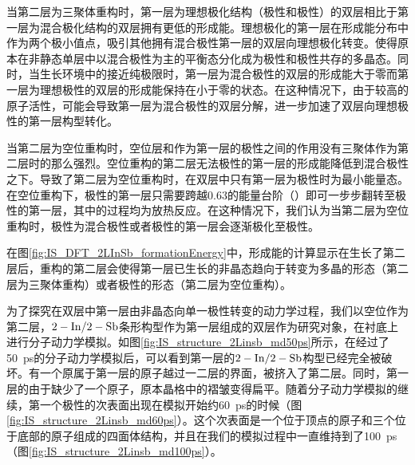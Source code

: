 当第二层为三聚体重构时，第一层为理想极化结构（极性和极性）的双层相比于第一层为混合极化结构的双层拥有更低的形成能。理想极化的第一层在形成能分布中作为两个极小值点，吸引其他拥有混合极性第一层的双层向理想极化转变。使得原本在非静态单层中以混合极性为主的平衡态分化成为极性和极性共存的多晶态。同时，当生长环境中的接近纯极限时，第一层为混合极性的双层的形成能大于零而第一层为理想极性的双层的形成能保持在小于零的状态。在这种情况下，由于较高的原子活性，可能会导致第一层为混合极性的双层分解，进一步加速了双层向理想极性的第一层构型转化。

当第二层为空位重构时，空位层和作为第一层的极性之间的作用没有三聚体作为第二层时的那么强烈。空位重构的第二层无法极性的第一层的形成能降低到混合极性之下。导致了第二层为空位重构时，在双层中只有第一层为极性时为最小能量态。在空位重构下，极性的第一层只需要跨越\SI{0.63}{\mievpas}的能量台阶（）即可一步步翻转至极性的第一层，其中的过程均为放热反应。在这种情况下，我们认为当第二层为空位重构时，极性为混合极性或者极性的第一层会逐渐极化至极性。

在图\ref{fig:IS_DFT_2LInSb_formationEnergy}中，形成能的计算显示在生长了第二层后，重构的第二层会使得第一层已生长的非晶态趋向于转变为多晶的形态（第二层为三聚体重构）或者极性的形态（第二层为空位重构）。

为了探究在双层中第一层由非晶态向单一极性转变的动力学过程，我们以空位作为第二层，$\rm 2-In/2-Sb$条形构型作为第一层组成的双层作为研究对象，在衬底上进行分子动力学模拟。如图\ref{fig:IS_structure_2Linsb_md50ps}所示，在经过了\SI{50}{\pico\second}的分子动力学模拟后，可以看到第一层的$\rm 2-In/2-Sb$构型已经完全被破坏。有一个原属于第一层的原子越过一二层的界面，被挤入了第二层。同时，第一层的由于缺少了一个原子，原本晶格中的褶皱变得扁平。随着分子动力学模拟的继续，第一个极性的次表面出现在模拟开始约\SI{60}{\pico\second}的时候（图\ref{fig:IS_structure_2Linsb_md60ps}）。这个次表面是一个位于顶点的原子和三个位于底部的原子组成的四面体结构，并且在我们的模拟过程中一直维持到了\SI{100}{\pico\second}（图\ref{fig:IS_structure_2Linsb_md100ps}）。

